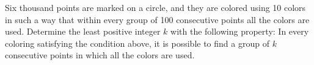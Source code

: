 Six thousand points are marked on a circle, and they are colored using 10 colors in such a way that within every group of 100 consecutive points all the colors are used. Determine the least positive integer $ k$ with the following property: In every coloring satisfying the condition above, it is possible to find a group of $ k$ consecutive points in which all the colors are used.
